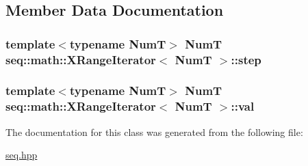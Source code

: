 \subsection{Member Data Documentation}
\hypertarget{classseq_1_1math_1_1_x_range_iterator_a73d7e94422117d0f2eff60edb9cb4273}{
\subsubsection[{step}]{\setlength{\rightskip}{0pt plus 5cm}template$<$typename Num\-T$>$ Num\-T {\bf seq\-::math\-::\-X\-Range\-Iterator}$<$ Num\-T $>$\-::{\bf step}}}\label{classseq_1_1math_1_1_x_range_iterator_a73d7e94422117d0f2eff60edb9cb4273}
\hypertarget{classseq_1_1math_1_1_x_range_iterator_aab232a017c574d7190828cc2633aad4a}{
\subsubsection[{val}]{\setlength{\rightskip}{0pt plus 5cm}template$<$typename Num\-T$>$ Num\-T {\bf seq\-::math\-::\-X\-Range\-Iterator}$<$ Num\-T $>$\-::{\bf val}}}\label{classseq_1_1math_1_1_x_range_iterator_aab232a017c574d7190828cc2633aad4a}


The documentation for this class was generated from the following file\-:\begin{DoxyCompactItemize}
\item 
\hyperlink{seq_8hpp}{seq.\-hpp}\end{DoxyCompactItemize}
